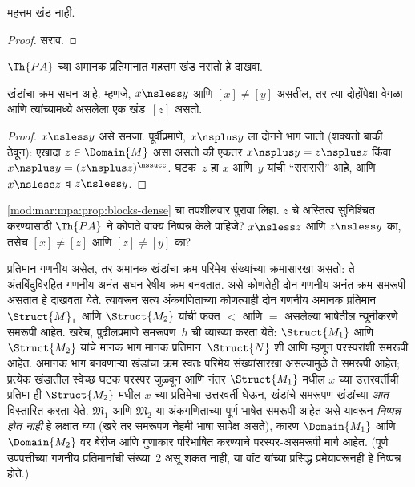 \begin{prop}
महत्तम खंड नाही.
\end{prop}

\begin{proof}
सराव.
\end{proof}

\begin{prob}
$\Th{PA}$ च्या अमानक प्रतिमानात महत्तम खंड नसतो हे दाखवा.
\end{prob}

\begin{prop}
\label{mod:mar:mpa:prop:blocks-dense}
खंडांचा क्रम सघन आहे. म्हणजे, $x \nsless y$ आणि $[x] \neq [y]$ असतील,
तर त्या दोहोंपेक्षा वेगळा आणि त्यांच्यामध्ये असलेला एक खंड~$[z]$ असतो.
\end{prop}

\begin{proof}
$x \nsless y$ असे समजा. पूर्वीप्रमाणे, $x \nsplus y$ ला दोनने भाग जातो
(शक्यतो बाकी ठेवून): एखादा $z \in \Domain{M}$ असा असतो की एकतर
$x \nsplus y = z \nsplus z$ किंवा
$x \nsplus y = (z \nsplus z)^\nssucc$. घटक~$z$ हा $x$ आणि~$y$ यांची
``सरासरी'' आहे, आणि $x \nsless z$ व $z \nsless y$.

\end{proof}

\begin{prob}
\ref{mod:mar:mpa:prop:blocks-dense} चा तपशीलवार पुरावा लिहा.
$z$ चे अस्तित्व सुनिश्चित करण्यासाठी $\Th{PA}$ ने कोणते वाक्य
निष्पन्न केले पाहिजे? $x \nsless z$ आणि $z \nsless y$ का, तसेच
$[x] \neq [z]$ आणि $[z] \neq [y]$ का?
\end{prob}

\begin{explain}
प्रतिमान गणनीय असेल, तर अमानक खंडांचा क्रम परिमेय संख्यांच्या क्रमासारखा
असतो: ते अंतबिंदुविरहित गणनीय अनंत सघन रेषीय क्रम बनवतात. असे
कोणतेही दोन गणनीय अनंत क्रम समरूपी असतात हे दाखवता येते. त्यावरून
सत्य अंकगणिताच्या कोणत्याही दोन गणनीय अमानक प्रतिमान
$\Struct{M}_1$ आणि $\Struct{M_2}$ यांची फक्त $<$ आणि $=$ असलेल्या भाषेतील
न्यूनीकरणे समरूपी आहेत. खरेच, पुढीलप्रमाणे समरूपण~$h$ ची व्याख्या करता
येते: $\Struct{M_1}$ आणि $\Struct{M_2}$ यांचे मानक भाग मानक
प्रतिमान~$\Struct{N}$ शी आणि म्हणून परस्परांशी समरूपी आहेत. अमानक भाग
बनवणाऱ्या खंडांचा क्रम स्वतः परिमेय संख्यांसारखा असल्यामुळे ते समरूपी आहेत;
प्रत्येक खंडातील स्वेच्छ घटक परस्पर जुळवून आणि नंतर $\Struct{M_1}$ मधील
$x$ च्या उत्तरवर्तीची प्रतिमा ही $\Struct{M_2}$ मधील $x$ च्या प्रतिमेचा
उत्तरवर्ती घेऊन, खंडांचे समरूपण खंडांच्या \emph{आत} विस्तारित करता येते.
$\mathfrak{M}_1$ आणि $\mathfrak{M}_2$ या अंकगणिताच्या पूर्ण भाषेत समरूपी
आहेत असे यावरून \emph{निष्पन्न होत नाही} हे लक्षात घ्या (खरे तर समरूपण
नेहमी भाषा सापेक्ष असते), कारण $\Domain{M_1}$ आणि
$\Domain{M_2}$ वर बेरीज आणि गुणाकार परिभाषित करण्याचे परस्पर-असमरूपी मार्ग
आहेत. (पूर्ण उपपत्तीच्या गणनीय प्रतिमानांची संख्या~2 असू शकत नाही, या
वॉट यांच्या प्रसिद्ध प्रमेयावरूनही हे निष्पन्न होते.)

\end{explain}










